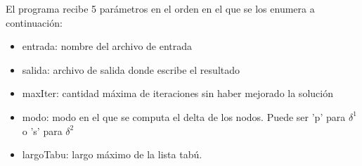 El programa recibe 5 parámetros en el orden en el que se los enumera a continuación:
\begin{itemize}
\item entrada: nombre del archivo de entrada
\item salida: archivo de salida donde escribe el resultado 
\item maxIter: cantidad máxima de iteraciones sin haber mejorado la solución
\item modo: modo en el que se computa el delta de los nodos. Puede ser 'p' para $\delta^1$ o 's' para $\delta^2$
\item largoTabu: largo máximo de la lista tabú.
\end{itemize}
